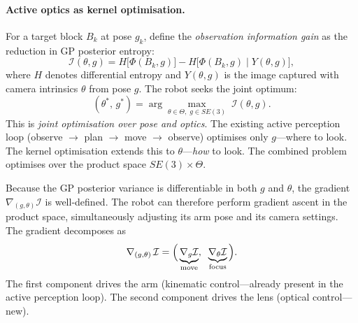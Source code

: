 \paragraph{Active optics as kernel optimisation.}
For a target block $B_k$ at pose $g_k$, define the
\emph{observation information gain} as the reduction in GP posterior
entropy:
\begin{equation}\label{eq:m-info-gain}
  \mathcal{I}(\theta, g)
  = H\bigl[\Phi(B_k, g)\bigr]
  - H\bigl[\Phi(B_k, g) \mid Y(\theta, g)\bigr],
\end{equation}
where $H$ denotes differential entropy and $Y(\theta, g)$ is the image
captured with camera intrinsics $\theta$ from pose $g$.  The robot
seeks the joint optimum:
\begin{equation}\label{eq:m-joint-opt}
  (\theta^*,\, g^*)
  = \arg\max_{\theta \in \Theta,\; g \in SE(3)}
  \;\mathcal{I}(\theta, g).
\end{equation}
This is \emph{joint optimisation over pose and optics}.  The existing
active perception loop (observe $\to$ plan $\to$ move $\to$ observe)
optimises only $g$---where to look.  The kernel optimisation extends
this to $\theta$---\emph{how} to look.  The combined problem optimises
over the product space $SE(3) \times \Theta$.

Because the GP posterior variance is differentiable in both $g$ and
$\theta$, the gradient $\nabla_{(g,\theta)}\mathcal{I}$ is
well-defined.  The robot can therefore perform gradient ascent in the
product space, simultaneously adjusting its arm pose and its camera
settings.  The gradient decomposes as
\begin{equation}\label{eq:m-gradient-decomp}
  \nabla_{(g,\theta)}\,\mathcal{I}
  = \Bigl(\,
    \underbrace{\nabla_g \mathcal{I}}_{\text{move}},\;\;
    \underbrace{\nabla_\theta \mathcal{I}}_{\text{focus}}
  \,\Bigr).
\end{equation}
The first component drives the arm (kinematic control---already
present in the active perception loop).  The second component drives
the lens (optical control---new).

